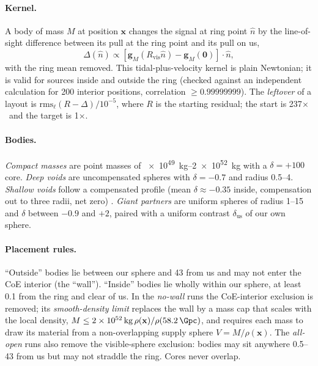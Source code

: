 \documentclass[aps,prd,twocolumn,nofootinbib,superscriptaddress,floatfix]{revtex4-2}
\newcommand{\fl}{\ensuremath{\times}}
\begin{document}
\paragraph*{Kernel.} A body of mass $M$ at position $\mathbf{x}$ changes the signal at ring point $\hat n$ by the line-of-sight difference between its pull at the ring point and its pull on us,
\begin{equation}
\Delta(\hat n)\propto\left[\mathbf{g}_M(R_\mathrm{vis}\hat n)-\mathbf{g}_M(\mathbf{0})\right]\cdot\hat n ,
\end{equation}
with the ring mean removed. This tidal-plus-velocity kernel is plain Newtonian; it is valid for sources inside and outside the ring (checked against an independent calculation for 200 interior positions, correlation $\geq0.99999999$). The \emph{leftover} of a layout is $\mathrm{rms}_\ell(R-\Delta)/10^{-5}$, where $R$ is the starting residual; the start is 237\fl\ and the target is 1\fl.

\paragraph*{Bodies.} \emph{Compact masses} are point masses of \SIrange{e49}{2e52}{\kilo\gram} with a $\delta=+100$ core. \emph{Deep voids} are uncompensated spheres with $\delta=-0.7$ and radius \SIrange{0.5}{4}{\Gpc}. \emph{Shallow voids} follow a compensated profile (mean $\delta\approx-0.35$ inside, compensation out to three radii, net zero) \cite{ClampittJain2015}. \emph{Giant partners} are uniform spheres of radius \SIrange{1}{15}{\Gpc} and $\delta$ between $-0.9$ and $+2$, paired with a uniform contrast $\delta_\mathrm{us}$ of our own sphere.

\paragraph*{Placement rules.} ``Outside'' bodies lie between our sphere and \SI{43}{\Gpc} from us and may not enter the CoE interior (the ``wall''). ``Inside'' bodies lie wholly within our sphere, at least \SI{0.1}{\Gpc} from the ring and clear of us. In the \emph{no-wall} runs the CoE-interior exclusion is removed; its \emph{smooth-density limit} replaces the wall by a mass cap that scales with the local density, $M\le\SI{2e52}{\kilo\gram}\,\rho(\mathbf{x})/\rho(\SI{58.2}{\Gpc})$, and requires each mass to draw its material from a non-overlapping supply sphere $V=M/\rho(\mathbf{x})$. The \emph{all-open} runs also remove the visible-sphere exclusion: bodies may sit anywhere \SIrange{0.5}{43}{\Gpc} from us but may not straddle the ring. Cores never overlap.
\end{document}
